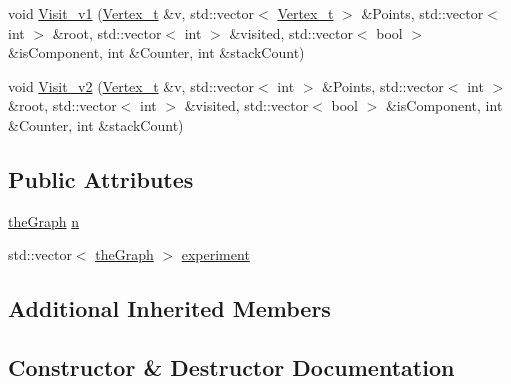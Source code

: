 \begin{DoxyCompactItemize}
void \hyperlink{class_nuutila_a83b47177cf452e80b3ceaf064ff59840_a83b47177cf452e80b3ceaf064ff59840}{Visit\+\_\+v1} (\hyperlink{class_graph_component_ae67114a6ce5a001dc35e1996e1b45aa0_ae67114a6ce5a001dc35e1996e1b45aa0}{Vertex\+\_\+t} \&v, std\+::vector$<$ \hyperlink{class_graph_component_ae67114a6ce5a001dc35e1996e1b45aa0_ae67114a6ce5a001dc35e1996e1b45aa0}{Vertex\+\_\+t} $>$ \&Points, std\+::vector$<$ int $>$ \&root, std\+::vector$<$ int $>$ \&visited, std\+::vector$<$ bool $>$ \&is\+Component, int \&Counter, int \&stack\+Count)
\item 
void \hyperlink{class_nuutila_afc7a8c27d8de17ac2679f839ff8c2749_afc7a8c27d8de17ac2679f839ff8c2749}{Visit\+\_\+v2} (\hyperlink{class_graph_component_ae67114a6ce5a001dc35e1996e1b45aa0_ae67114a6ce5a001dc35e1996e1b45aa0}{Vertex\+\_\+t} \&v, std\+::vector$<$ int $>$ \&Points, std\+::vector$<$ int $>$ \&root, std\+::vector$<$ int $>$ \&visited, std\+::vector$<$ bool $>$ \&is\+Component, int \&Counter, int \&stack\+Count)
\end{DoxyCompactItemize}
\subsection*{Public Attributes}
\begin{DoxyCompactItemize}
\item 
\hyperlink{class_graph_component_a982e0748a6e1b8dc74986f5f8b3dca5c_a982e0748a6e1b8dc74986f5f8b3dca5c}{the\+Graph} \hyperlink{class_nuutila_a1409929fa0f38709497f8bdb012af71c_a1409929fa0f38709497f8bdb012af71c}{n}
\item 
std\+::vector$<$ \hyperlink{class_graph_component_a982e0748a6e1b8dc74986f5f8b3dca5c_a982e0748a6e1b8dc74986f5f8b3dca5c}{the\+Graph} $>$ \hyperlink{class_nuutila_a70e8a910cc4050d246db2540bd1e36c5_a70e8a910cc4050d246db2540bd1e36c5}{experiment}
\end{DoxyCompactItemize}
\subsection*{Additional Inherited Members}


\subsection{Constructor \& Destructor Documentation}
\mbox{\label{class_nuutila_ab1ae0281145f693a922f5122d27cc23b_ab1ae0281145f693a922f5122d27cc23b}} 
